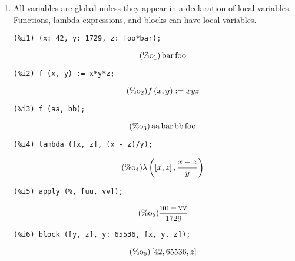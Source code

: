 \documentclass[12pt,leqno]{article}
\begin{document}
\begin{enumerate}

\item All variables are global unless they appear in a declaration of local variables.
Functions, lambda expressions, and blocks can have local variables.

\begin{verbatim}
(%i1) (x: 42, y: 1729, z: foo*bar);
\end{verbatim}
\begin{equation}
\tag{$\mathop{\mathrm{\%o}}_{1}$}\mathop{\mathrm{bar}} \mathop{\mathrm{foo}}
\label{eq:doc-group1-code34-1-1}
\end{equation}
\begin{verbatim}
(%i2) f (x, y) := x*y*z;
\end{verbatim}
\begin{equation}
\tag{$\mathop{\mathrm{\%o}}_{2}$}f\left(x, y\right) := x y z
\label{eq:doc-group1-code34-2-1}
\end{equation}
\begin{verbatim}
(%i3) f (aa, bb);
\end{verbatim}
\begin{equation}
\tag{$\mathop{\mathrm{\%o}}_{3}$}\mathop{\mathrm{aa}} \mathop{\mathrm{bar}} \mathop{\mathrm{bb}} \mathop{\mathrm{foo}}
\label{eq:doc-group1-code34-3-1}
\end{equation}
\begin{verbatim}
(%i4) lambda ([x, z], (x - z)/y);
\end{verbatim}
\begin{equation}
\tag{$\mathop{\mathrm{\%o}}_{4}$}\lambda\left(\left[x, z\right], \frac{x-z}{y}\right)
\label{eq:doc-group1-code34-4-1}
\end{equation}
\begin{verbatim}
(%i5) apply (%, [uu, vv]);
\end{verbatim}
\begin{equation}
\tag{$\mathop{\mathrm{\%o}}_{5}$}\frac{\mathop{\mathrm{uu}}-\mathop{\mathrm{vv}}}{1729}
\label{eq:doc-group1-code34-5-1}
\end{equation}
\begin{verbatim}
(%i6) block ([y, z], y: 65536, [x, y, z]);
\end{verbatim}
\begin{equation}
\tag{$\mathop{\mathrm{\%o}}_{6}$}\left[42, 65536, z\right]
\label{eq:doc-group1-code34-6-1}
\end{equation}



\end{enumerate}
\end{document}
